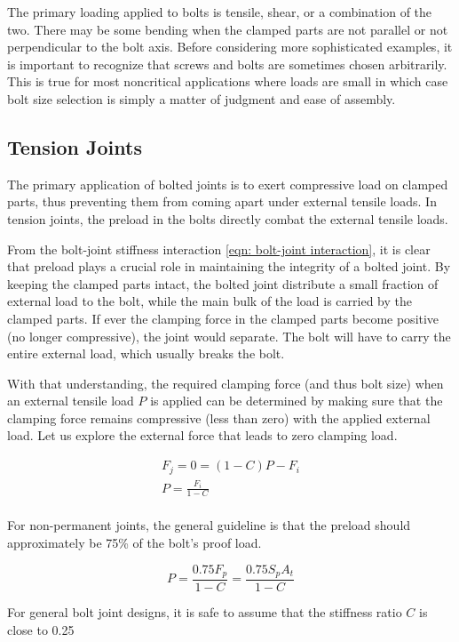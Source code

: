 \documentclass[
10pt,
a4paper,
openany,
svgnames,
]{book}
\begin{document}
The primary loading applied to bolts is tensile, shear, or a combination of the two. There may be some bending when the clamped parts are not parallel or not perpendicular to the bolt axis. Before considering more sophisticated examples, it is important to recognize that screws and bolts are sometimes chosen arbitrarily. This is true for most noncritical applications where loads are small in which case bolt size selection is simply a matter of judgment and ease of assembly.

\subsection{Tension Joints}

The primary application of bolted joints is to exert compressive load on clamped parts, thus preventing them from coming apart under external tensile loads. In tension joints, the preload in the bolts directly combat the external tensile loads.

From the bolt-joint stiffness interaction \cref{eqn: bolt-joint interaction}, it is clear that preload plays a crucial role in maintaining the integrity of a bolted joint. By keeping the clamped parts intact, the bolted joint distribute a small fraction of external load to the bolt, while the main bulk of the load is carried by the clamped parts. If ever the clamping force in the clamped parts become positive (no longer compressive), the joint would separate. The bolt will have to carry the entire external load, which usually breaks the bolt.

With that understanding, the required clamping force (and thus bolt size) when an external tensile load $P$ is applied can be determined by making sure that the clamping force remains compressive (less than zero) with the applied external load. Let us explore the external force that leads to zero clamping load.

\[\begin{gathered}
  F_j = 0 = (1 - C)P - F_i \\ 
  P = \frac{F_i}{1 - C} \\ 
\end{gathered} \]

For non-permanent joints, the general guideline is that the preload should approximately be 75\% of the bolt’s proof load.

\[P = \frac{0.75F_p}{1 - C} = \frac{0.75S_pA_t}{1 - C}\]

For general bolt joint designs, it is safe to assume that the stiffness ratio $C$ is close to 0.25
\end{document}
